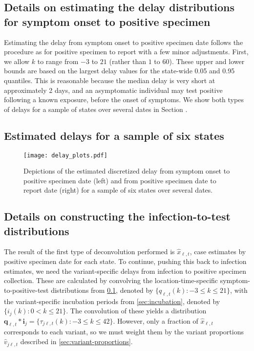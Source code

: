 \subsection{Details on estimating the delay distributions for symptom onset to positive specimen}
\label{supp:delay-sops}

Estimating the delay from symptom onset to positive specimen date follows the
procedure as for positive specimen to report with a few minor adjustments. 
First, we allow $k$ to range from
$-3$ to $21$ (rather than $1$ to $60$). These upper and lower bounds are based on
the largest delay values for the state-wide 0.05 and 0.95 quantiles. This is
reasonable because the median delay is very short at approximately 2 days, and
an asymptomatic individual may test positive following a known exposure, before
the onset of symptoms. We show
both types of delays for a sample of states over several dates
in Section .


\subsection{Estimated delays for a sample of six states}
\label{supp:est-delays-samp}

\begin{figure}[H]
\centering
    \texttt{[image: delay\_plots.pdf]} 
    \caption{Depictions of the estimated discretized delay from symptom onset to 
    positive specimen date (left) and from positive specimen date to report date (right)
    for a sample of six states over several dates.}
    \label{fig:delay-plots-samp}
\end{figure}


\subsection{Details on constructing the infection-to-test distributions}
\label{supp:details-conv}

The result of the first type of deconvolution performed is $\widehat{x}_{\ell,t}$, case estimates
by positive specimen date for each state. To continue, pushing this back to infection
estimates, we need the variant-specific delays from infection to positive
specimen collection. These are calculated by convolving the
location-time-specific symptom-to-positive-test distributions from
\ref{supp:delay-sops}, denoted by $\{q_{\ell,t}(k) : -3\leq k \leq 21\}$, with
the variant-specific incubation periods from \ref{sec:incubation}, denoted
by $\{i_{j}(k) : 0 < k \leq 21\}$. The convolution of these yields a
distribution $\mathbf{q}_{\ell,t}*\mathbf{i}_j = \{\tau_{j\ell,t}(k): -3 \leq k
\leq 42\}$. However, only a fraction of $\widehat{x}_{\ell,t}$ corresponds to
each variant, so we must weight them by the variant proportions
$\widehat{v}_{j\ell,t}$ described in \ref{sec:variant-proportions}.



